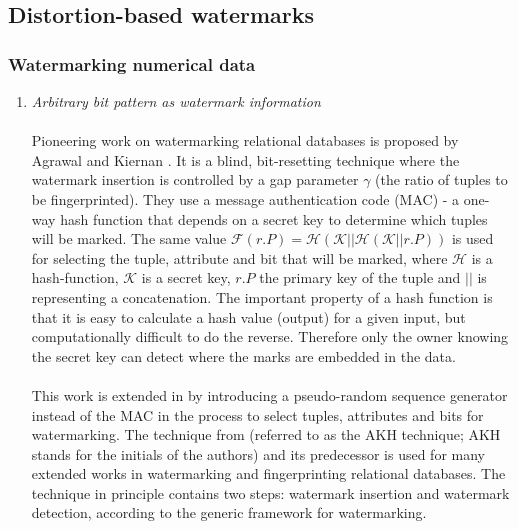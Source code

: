 \subsection{Distortion-based watermarks}
\subsubsection{Watermarking numerical data}
\begin{enumerate}[leftmargin=*]
    \item \textit{Arbitrary bit pattern as watermark information}
\paragraph{}
Pioneering work on watermarking relational databases is proposed by Agrawal and Kiernan \cite{agrawal2002watermarking}. It is a blind, bit-resetting technique where the watermark insertion is controlled by a gap parameter $\gamma$ (the ratio of tuples to be fingerprinted). 
They use a message authentication code (MAC) - a one-way hash function that depends on a secret key to determine which tuples will be marked. 
The same value $\mathcal{F}(r.P)=\mathcal{H}(\mathcal{K}||\mathcal{H}(\mathcal{K}||r.P))$ is used for selecting the tuple, attribute and bit that will be marked, where $\mathcal{H}$ is a hash-function, $\mathcal{K}$ is a secret key, $r.P$ the primary key of the tuple and $||$ is representing a concatenation.
The important property of a hash function is that it is easy to calculate a hash value (output) for a given input, but computationally difficult to do the reverse. 
Therefore only the owner knowing the secret key can detect where the marks are embedded in the data.
\paragraph{}
This work is extended in \cite{agrawal2003system, agrawal2003watermarking} by introducing a pseudo-random sequence generator instead of the MAC in the process to select tuples, attributes and bits for watermarking.
The technique from \cite{agrawal2003watermarking} (referred to as the AKH technique; AKH stands for the initials of the authors) and its predecessor \cite{agrawal2002watermarking} is used for many extended works in watermarking and fingerprinting relational databases.
The technique in principle contains two steps: watermark insertion and watermark detection, according to the generic framework for watermarking. 


\end{enumerate}
